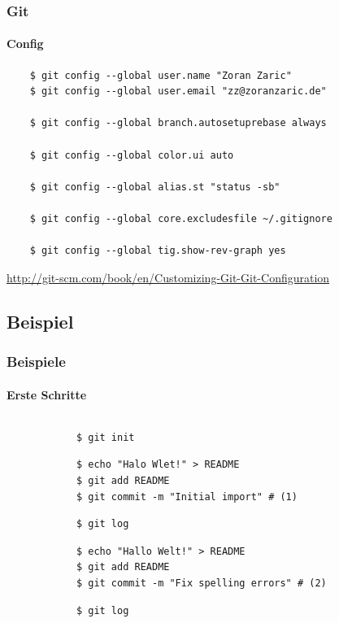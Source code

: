 \documentclass[]{beamer}
\begin{document}
\begin{frame}[fragile]
	\frametitle{Git}
	\framesubtitle{Config}
	\begin{verbatim}
	$ git config --global user.name "Zoran Zaric"
	$ git config --global user.email "zz@zoranzaric.de"

	$ git config --global branch.autosetuprebase always

	$ git config --global color.ui auto

	$ git config --global alias.st "status -sb"

	$ git config --global core.excludesfile ~/.gitignore

	$ git config --global tig.show-rev-graph yes
	\end{verbatim}

	\fontsize{9}{10}\selectfont
	\url{http://git-scm.com/book/en/Customizing-Git-Git-Configuration}
\end{frame}

\subsection{Beispiel}
\begin{frame}[fragile]
	\frametitle{Beispiele}
	\framesubtitle{Erste Schritte}
	\begin{columns}[T]
		\begin{column}{7.5cm}
			\begin{verbatim}
			$ git init
			\end{verbatim}

			\begin{verbatim}
			$ echo "Halo Wlet!" > README
			$ git add README
			$ git commit -m "Initial import" # (1)
			\end{verbatim}

			\begin{verbatim}
			$ git log
			\end{verbatim}

			\begin{verbatim}
			$ echo "Hallo Welt!" > README
			$ git add README
			$ git commit -m "Fix spelling errors" # (2)
			\end{verbatim}

			\begin{verbatim}
			$ git log
			\end{verbatim}
		\end{column}
		\begin{column}{2.5cm}
		\end{column}
	\end{columns}
\end{frame}
\end{document}
